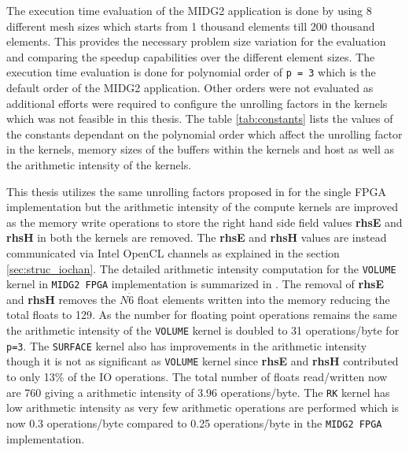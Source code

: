 The execution time evaluation of the MIDG2 application is done by using
8 different mesh sizes which starts from 1 thousand elements till
200 thousand elements. This provides the necessary problem size
variation for the evaluation and comparing the speedup capabilities
over the different element sizes. The execution time evaluation
is done for polynomial order of \texttt{p = 3} which is the default
order of the MIDG2 application. Other orders were not evaluated as
additional efforts were required to configure the unrolling factors
in the kernels which was not feasible in this thesis. The table
\ref{tab:constants} lists the values of the constants dependant
on the polynomial order which affect the unrolling factor in the
kernels, memory sizes of the buffers within the kernels and
host as well as the arithmetic intensity of the kernels.

This thesis utilizes the same unrolling factors proposed in
\cite{kenter_opencl-based_2018} for the single FPGA implementation
but the arithmetic intensity of the compute kernels are
improved as the memory write operations to store the right hand side field values
\textbf{rhsE} and \textbf{rhsH} in both the kernels are removed.
The \textbf{rhsE} and \textbf{rhsH} values are instead communicated via Intel OpenCL channels
as explained in the section \ref{sec:struc_iochan}. The detailed arithmetic intensity
computation for the \texttt{VOLUME} kernel in \texttt{MIDG2 FPGA} implementation is summarized
in \cite{kenter_opencl-based_2018, TABLE I}. The removal of \textbf{rhsE} and \textbf{rhsH}
removes the $N\dot{6}$ float elements written into the memory
reducing the total floats to 129. As the number for floating point operations remains the same
the arithmetic intensity of the \texttt{VOLUME} kernel is doubled to 31 operations/byte for \texttt{p=3}.
The \texttt{SURFACE} kernel also has improvements in the arithmetic intensity though it is not
as significant as \texttt{VOLUME} kernel since \textbf{rhsE} and \textbf{rhsH} contributed
to only 13\% of the IO operations. The total number of floats read/written now are 760
giving a arithmetic intensity of 3.96 operations/byte. The \texttt{RK} kernel has low arithmetic
intensity as very few arithmetic operations are performed which is now 0.3 operations/byte
compared to 0.25 operations/byte in the \texttt{MIDG2 FPGA} implementation.

